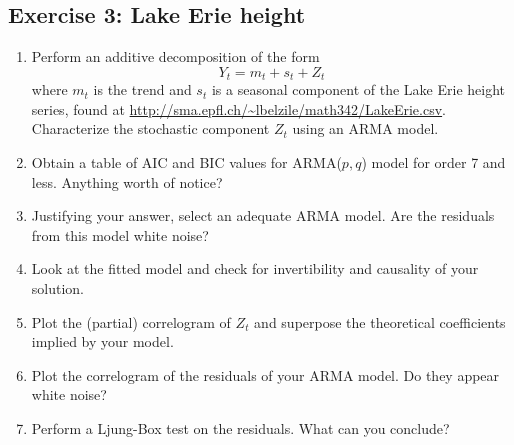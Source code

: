 \documentclass[]{book}
\newenvironment{Shaded}{\begin{snugshade}}{\end{snugshade}}
\newcommand{\KeywordTok}[1]{\textcolor[rgb]{0.13,0.29,0.53}{\textbf{#1}}}
\newcommand{\DataTypeTok}[1]{\textcolor[rgb]{0.13,0.29,0.53}{#1}}
\newcommand{\DecValTok}[1]{\textcolor[rgb]{0.00,0.00,0.81}{#1}}
\newcommand{\StringTok}[1]{\textcolor[rgb]{0.31,0.60,0.02}{#1}}
\newcommand{\OtherTok}[1]{\textcolor[rgb]{0.56,0.35,0.01}{#1}}
\newcommand{\OperatorTok}[1]{\textcolor[rgb]{0.81,0.36,0.00}{\textbf{#1}}}
\newcommand{\NormalTok}[1]{#1}
\providecommand{\tightlist}{%
  \setlength{\itemsep}{0pt}\setlength{\parskip}{0pt}}
\begin{document}
\subsection{Exercise 3: Lake Erie
height}\label{exercise-3-lake-erie-height-1}

\begin{enumerate}
\def\labelenumi{\arabic{enumi}.}
\tightlist
\item
  Perform an additive decomposition of the form
  \[Y_t = m_t + s_t + Z_t\] where \(m_t\) is the trend and \(s_t\) is a
  seasonal component of the Lake Erie height series, found at
  \href{\%5Bhttp://sma.epfl.ch/~lbelzile/math342/LakeErie.csv\%5D}{http://sma.epfl.ch/\textasciitilde{}lbelzile/math342/LakeErie.csv}.
  Characterize the stochastic component \(Z_t\) using an ARMA model.
\item
  Obtain a table of AIC and BIC values for ARMA(\(p, q\)) model for
  order 7 and less. Anything worth of notice?
\item
  Justifying your answer, select an adequate ARMA model. Are the
  residuals from this model white noise?
\item
  Look at the fitted model and check for invertibility and causality of
  your solution.
\item
  Plot the (partial) correlogram of \(Z_t\) and superpose the
  theoretical coefficients implied by your model.
\item
  Plot the correlogram of the residuals of your ARMA model. Do they
  appear white noise?
\item
  Perform a Ljung-Box test on the residuals. What can you conclude?
\end{enumerate}

\begin{Shaded}
\end{Shaded}
\end{document}
